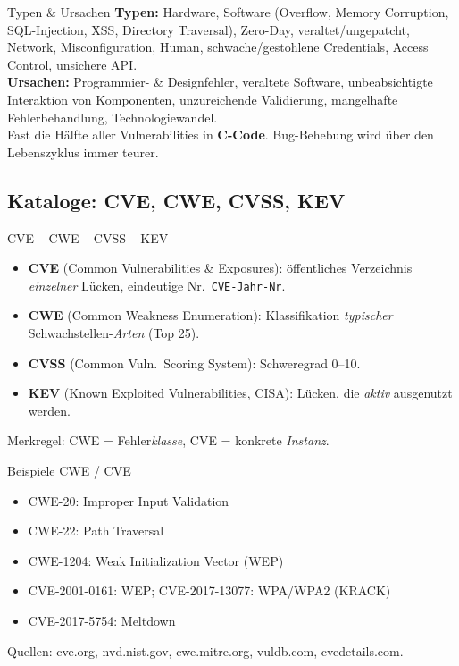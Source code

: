 \documentclass[a4paper, fontsize=7pt]{scrartcl}
\begin{document}
\begin{subbox}{Typen \& Ursachen}
\textbf{Typen:} Hardware, Software (Overflow, Memory Corruption,
SQL-Injection, XSS, Directory Traversal), Zero-Day, veraltet/ungepatcht,
Network, Misconfiguration, Human, schwache/gestohlene Credentials,
Access Control, unsichere API.\\
\textbf{Ursachen:} Programmier- \& Designfehler, veraltete Software,
unbeabsichtigte Interaktion von Komponenten, unzureichende Validierung,
mangelhafte Fehlerbehandlung, Technologiewandel.\\
Fast die Hälfte aller Vulnerabilities in \textbf{C-Code}.
Bug-Behebung wird über den Lebenszyklus immer teurer.
\end{subbox}

\subsection{Kataloge: CVE, CWE, CVSS, KEV}

\begin{mainbox}{CVE -- CWE -- CVSS -- KEV}
\begin{itemize}
    \item \textbf{CVE} (Common Vulnerabilities \& Exposures): öffentliches
          Verzeichnis \emph{einzelner} Lücken, eindeutige Nr.\
          \texttt{CVE-Jahr-Nr}.
    \item \textbf{CWE} (Common Weakness Enumeration): Klassifikation
          \emph{typischer} Schwachstellen-\emph{Arten} (Top 25).
    \item \textbf{CVSS} (Common Vuln.\ Scoring System): Schweregrad
          0--10.
    \item \textbf{KEV} (Known Exploited Vulnerabilities, CISA): Lücken,
          die \emph{aktiv} ausgenutzt werden.
\end{itemize}
Merkregel: CWE = Fehler\emph{klasse}, CVE = konkrete
\emph{Instanz}.
\end{mainbox}

\begin{subbox}{Beispiele CWE / CVE}
\begin{itemize}
    \item CWE-20: Improper Input Validation
    \item CWE-22: Path Traversal
    \item CWE-1204: Weak Initialization Vector (WEP)
    \item CVE-2001-0161: WEP; CVE-2017-13077: WPA/WPA2 (KRACK)
    \item CVE-2017-5754: Meltdown
\end{itemize}
Quellen: cve.org, nvd.nist.gov, cwe.mitre.org, vuldb.com, cvedetails.com.
\end{subbox}
\end{document}
